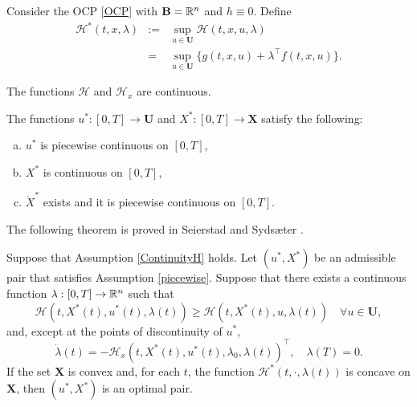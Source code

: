Consider the OCP \eqref{OCP} with $\mathbf{B}=\mathbb{R}^n$ and $h\equiv 0$. Define
\begin{eqnarray*}
\mathcal{H}^\ast(t,x,\lambda) & := & \sup_{u\in\mathbf{U}}\mathcal{H}(t,x,u,\lambda)\\
     & = & \sup_{u\in\mathbf{U}}\{g(t,x,u) + \lambda^\top f(t,x,u)\}.    
\end{eqnarray*}

\begin{assumption}\label{ContinuityH}\rm The functions $\mathcal{H}$ and $\mathcal{H}_x$ are continuous. 
\end{assumption}


\begin{assumption}\label{piecewise}\rm The functions $u^\ast:[0,T]\to\mathbf{U}$ and $X^\ast:[0,T]\to\mathbf{X}$ satisfy the following:
\begin{enumerate}[(a)]
    \item $u^\ast$ is piecewise continuous on $[0,T]$,
    \item $X^\ast$ is continuous on $[0,T]$, 
    \item $\dot{X}^\ast$ exists and it is piecewise  continuous on $[0,T]$.
\end{enumerate}
\end{assumption}


The following theorem is proved in Seierstad and Syds\ae ter \cite[Theorem 3]{SeiSyd77}.  

\begin{theorem}\label{SufficientCond} Suppose that Assumption \ref{ContinuityH} holds. Let $(u^\ast,X^\ast)$ be an admissible pair that satisfies Assumption \ref{piecewise}. Suppose that there exists a continuous function $\lambda:[0,T]\to \mathbb{R}^n$ such that 
   \begin{equation}
       \mathcal{H}(t,X^\ast(t),u^\ast(t),\lambda(t)) \geq
       \mathcal{H}(t,X^\ast(t),u,\lambda(t)) \quad \forall u\in\mathbf{U},
   \end{equation}
and, except at the points of discontinuity of $u^\ast$,
    \begin{equation}
         \dot{\lambda}(t) = -\mathcal{H}_x(t,X^\ast(t),u^\ast(t),\lambda_0,\lambda(t))^\top, \quad \lambda(T)=0.
    \end{equation}
If the set $\mathbf{X}$ is convex and, for each $t$, the function $\mathcal{H}^\ast(t,\cdot,\lambda(t))$ is concave on $\mathbf{X}$, then $(u^\ast,X^\ast)$ is an optimal pair.
\end{theorem}






